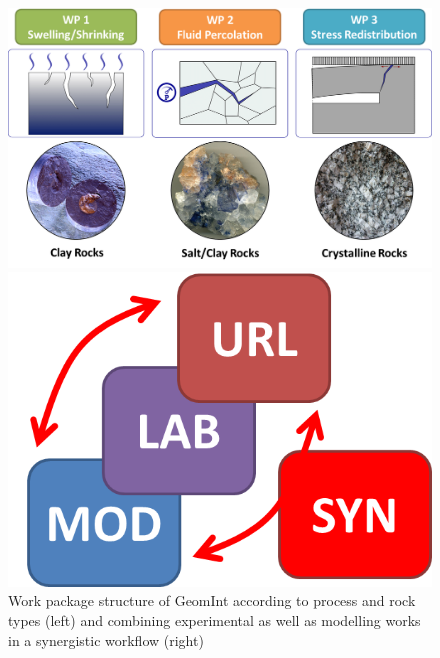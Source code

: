 \begin{figure}[ht!]
\begin{minipage}{0.69\textwidth}
\includegraphics[width=1\textwidth]{figures/geomint-concept-02.png}
\end{minipage}
\hfill
\begin{minipage}{0.29\textwidth}
\includegraphics[width=1\textwidth]{figures/modal01a.png}
\end{minipage}
\caption{Work package structure of GeomInt according to process and rock types (left) and combining experimental as well as modelling works in a synergistic workflow (right)}
\label{fig:pro02}
\end{figure}

